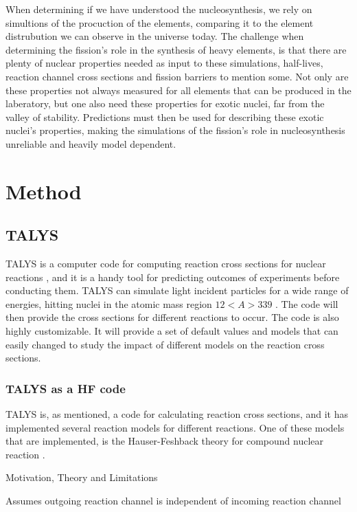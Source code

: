\documentclass[]{article}
\begin{document}
When determining if we have understood the nucleosynthesis, we rely on simultions of the procuction of the elements, comparing it to the element distrubution we can observe in the universe today.  The challenge when determining the fission's role in the synthesis of heavy elements, is that there are plenty of nuclear properties needed as input to these simulations, half-lives, reaction channel cross sections and fission barriers to mention some. Not only are these properties not always measured for all elements that can be produced in the laberatory, but one also need these properties for exotic nuclei, far from the valley of stability. Predictions must then be used for describing these exotic nuclei's properties, making the simulations of the fission's role in nucleosynthesis unreliable and heavily model dependent. 

\section{Method}

\subsection{TALYS}

TALYS is a computer code for computing reaction cross sections for nuclear reactions \cite{TALYSmanual}, and it is a handy tool for predicting outcomes of experiments before conducting them. TALYS can simulate light incident particles for a wide range of energies, hitting nuclei in the atomic mass region $12<A>339$ \cite{TALYSmanual}. The code will then provide the cross sections for different reactions to occur. The code is also highly customizable. It will provide a set of default values and models that can easily changed to study the impact of different models on the reaction cross sections.

\subsubsection{TALYS as a HF code}
TALYS is, as mentioned, a code for calculating reaction cross sections, and it has implemented several reaction models for different reactions. One of these models that are implemented, is the Hauser-Feshback theory for compound nuclear reaction \cite{TALYSweb}. 


Motivation, Theory and Limitations

Assumes outgoing reaction channel is independent of incoming reaction channel
\end{document}
